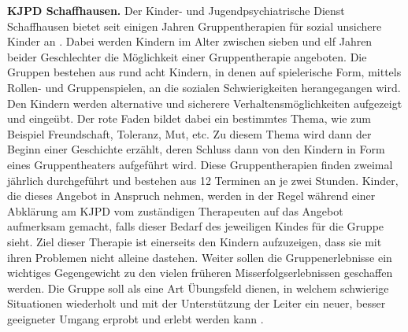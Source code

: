 \textbf{KJPD Schaffhausen.}
Der Kinder- und Jugendpsychiatrische Dienst Schaffhausen bietet seit einigen Jahren Gruppentherapien für sozial unsichere Kinder an \cite{KJPDW:2016}. Dabei werden Kindern im Alter zwischen sieben und elf Jahren beider Geschlechter die Möglichkeit einer Gruppentherapie angeboten. Die Gruppen bestehen aus rund acht Kindern, in denen auf spielerische Form, mittels Rollen- und Gruppenspielen, an die sozialen Schwierigkeiten herangegangen wird. Den Kindern werden alternative und sicherere Verhaltensmöglichkeiten aufgezeigt und eingeübt. Der rote Faden bildet dabei ein bestimmtes Thema, wie zum Beispiel Freundschaft, Toleranz, Mut, etc. Zu diesem Thema wird dann der Beginn einer Geschichte erzählt, deren Schluss dann von den Kindern in Form eines Gruppentheaters aufgeführt wird. Diese Gruppentherapien finden zweimal jährlich durchgeführt und bestehen aus 12 Terminen an je zwei Stunden. Kinder, die dieses Angebot in Anspruch nehmen, werden in der Regel während einer Abklärung am KJPD vom zuständigen Therapeuten auf das Angebot aufmerksam gemacht, falls dieser Bedarf des jeweiligen Kindes für die Gruppe sieht. Ziel dieser Therapie ist einerseits den Kindern aufzuzeigen, dass sie mit ihren Problemen nicht alleine dastehen. Weiter sollen die Gruppenerlebnisse ein wichtiges Gegengewicht zu den vielen früheren Misserfolgserlebnissen geschaffen werden. Die Gruppe soll als eine Art Übungsfeld dienen, in welchem schwierige Situationen wiederholt und mit der Unterstützung der Leiter ein neuer, besser geeigneter Umgang erprobt und erlebt werden kann \cite{KJPD:2016}. 

